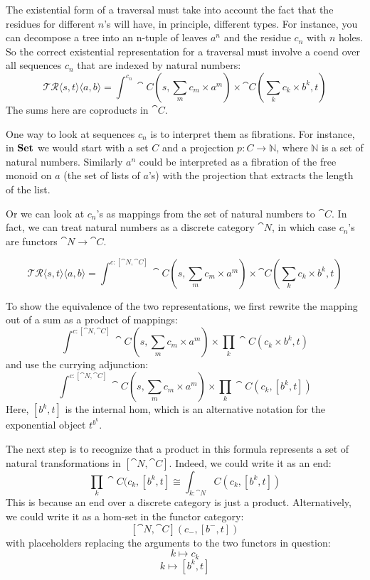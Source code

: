 \documentclass[DaoFP]{subfiles}
\begin{document}
The existential form of a traversal must take into account the fact that the residues for different $n$'s will have, in principle, different types. For instance, you can decompose a tree into an n-tuple of leaves $a^n$ and the residue $c_n$ with $n$ holes. So the correct existential representation for a traversal must involve a coend over all sequences $c_n$ that are indexed by natural numbers:
\[ \mathcal{TR} \langle s, t\rangle \langle a, b \rangle = \int^{c_n} \cat C (s, \sum_m c_m \times a^m) \times \cat C (\sum_k c_k \times b^k, t) \]
The sums here are coproducts in $\cat C$.

One way to look at sequences $c_n$ is to interpret them as fibrations. For instance, in $\mathbf{Set}$ we would start with a set $C$ and a projection $p \colon C \to \mathbb N$, where $\mathbb N$ is a set of natural numbers. Similarly $a^n$ could be interpreted as a fibration of the free monoid on $a$ (the set of lists of $a$'s) with the projection that extracts the length of the list.

Or we can look at $c_n$'s as mappings from the set of natural numbers to $\cat C$. In fact, we can treat natural numbers as a discrete category $\cat N$, in which case $c_n$'s are functors $\cat N \to \cat C$.

\[ \mathcal{TR} \langle s, t\rangle \langle a, b \rangle = \int^{c \colon [\cat N, \cat C]} \cat C (s, \sum_m c_m \times a^m) \times \cat C (\sum_k c_k \times b^k, t) \]

To show the equivalence of the two representations, we first rewrite the mapping out of a sum as a product of mappings:
\[\int^{c \colon [\cat N, \cat C]} \cat C (s, \sum_m c_m \times a^m) \times \prod_k \cat C (c_k \times b^k, t) \]
and use the currying adjunction:
\[\int^{c \colon [\cat N, \cat C]} \cat C (s, \sum_m c_m \times a^m) \times \prod_k \cat C (c_k,  [b^k, t]) \]
Here, $[b^k, t]$ is the internal hom, which is an alternative notation for the exponential object $t^{b^k}$.

The next step is to recognize that a product in this formula represents a set of natural transformations in $[\cat N, \cat C]$. Indeed, we could write it as an end:
 \[ \prod_k \cat C (c_k,  [b^k, t] \cong \int_{k : \cat N} C (c_k,  [b^k, t]) \]
This is because an end over a discrete category is just a product. Alternatively, we could write it as a hom-set in the functor category:
\[ [\cat N, \cat C](c_{-}, [b^{-}, t]) \]
with placeholders replacing the arguments to the two functors in question:
\[ k \mapsto c_k \]
\[ k \mapsto [b^k, t] \]
\end{document}
